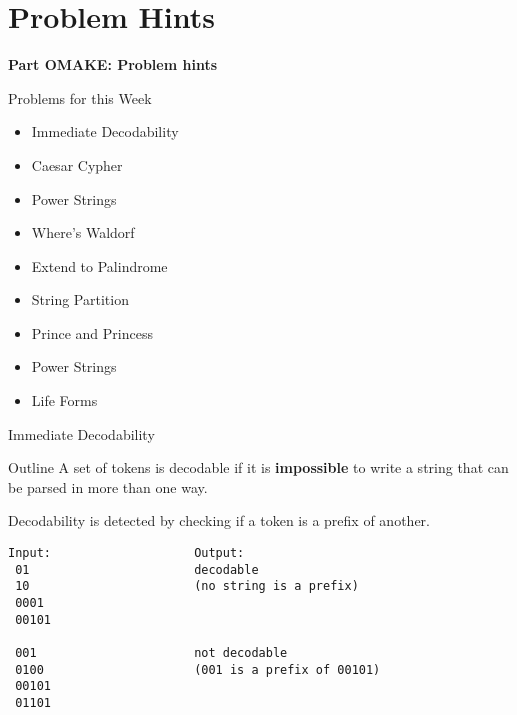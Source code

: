\section{Problem Hints}

\begin{frame}
  \begin{center}
  {\bf Part OMAKE: Problem hints}
  \end{center}
\end{frame}

\begin{frame}{Problems for this Week}

  \begin{itemize}
  \item Immediate Decodability
  \item Caesar Cypher
  \item Power Strings
  \item Where's Waldorf
  \item Extend to Palindrome
  \item String Partition
  \item Prince and Princess
  \item Power Strings
  \item Life Forms
  \end{itemize}

\end{frame}

\begin{frame}[fragile]{Immediate Decodability}
  \begin{block}{Outline}
    A set of tokens is decodable if it is {\bf impossible} to write a string that can be parsed in more than one way.\bigskip

    Decodability is detected by checking if a token is a prefix of another.
  \end{block}
  {\smaller
\begin{verbatim}
Input:                    Output:
 01                       decodable
 10                       (no string is a prefix)
 0001
 00101

 001                      not decodable
 0100                     (001 is a prefix of 00101)
 00101
 01101
\end{verbatim}}
\end{frame}

